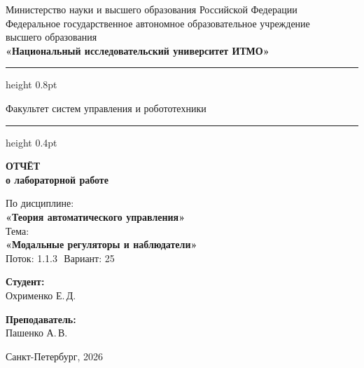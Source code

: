 \documentclass[a4paper,12pt]{article}
\begin{document}
\begin{titlepage}
	\centering
	
	\vspace*{0.5cm}
	{\small
		Министерство науки и высшего образования Российской Федерации\\[2pt]
		Федеральное государственное автономное образовательное учреждение\\
		высшего образования\\[2pt]
		\textbf{«Национальный исследовательский университет ИТМО»}\\
	}
	
	\vspace{0.8cm}
	\hrule height 0.8pt
	\vspace{0.3cm}
	
	{\large Факультет систем управления и робототехники}
	
	\vspace{0.3cm}
	\hrule height 0.4pt
	\vspace{2.5cm}
	
	{\Huge\bfseries ОТЧЁТ}\\[0.4cm]
	{\LARGE\bfseries о лабораторной работе}\\[0.8cm]
	
	\begin{tcolorbox}[
			colback=gray!4,
			colframe=gray!10,
			boxrule=0.8pt,
			arc=4pt,
			left=12pt, right=12pt, top=8pt, bottom=8pt
		]
		\centering
		{\large По дисциплине:\\[4pt]}
		{\large\bfseries «Теория автоматического управления»}\\[10pt]
		{\large Тема:\\[4pt]}
		{\large\bfseries «Модальные регуляторы и наблюдатели»} \\[10pt]
		{\large Поток: 1.1.3 \( \) Вариант: 25}
	\end{tcolorbox}
	
	\vspace{3cm}
	
	\begin{minipage}{0.45\textwidth}
		\raggedright
		{\large\bfseries Студент:}\\[4pt]
		Охрименко Е.\,Д.\\
	\end{minipage}
	\hfill
	\begin{minipage}{0.45\textwidth}
		\raggedleft
		{\large\bfseries Преподаватель:}\\[4pt]
		Пашенко А.\,В.\\
	\end{minipage}
	
	\vfill
	\vspace{0.4cm}
	{\large Санкт-Петербург, 2026}
\end{titlepage}
\newpage
\tableofcontents
\end{document}

